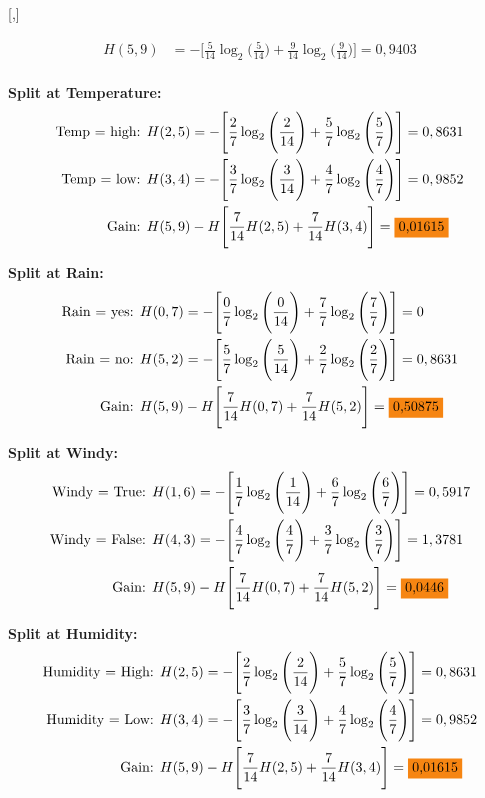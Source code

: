 \documentclass{article}
\begin{document}
[,]

\begin{align*}
    H(5,9) &= -\Bigg[\frac{5}{14} \log_2\Bigg(\frac{5}{14}\Bigg) + \frac{9}{14} \log_2\Bigg(\frac{9}{14}\Bigg)\Bigg] = 0,9403\\
\end{align*}

\textbf{Split at Temperature:}
\begin{align*}
    \text{Temp = high: } &H(2,5) = -\Bigg[\frac{2}{7} \log_2\Bigg(\frac{2}{14}\Bigg) + \frac{5}{7} \log_2\Bigg(\frac{5}{7}\Bigg)\Bigg] = 0,8631\\
    \text{Temp = low: } &H(3,4) = -\Bigg[\frac{3}{7} \log_2\Bigg(\frac{3}{14}\Bigg) + \frac{4}{7} \log_2\Bigg(\frac{4}{7}\Bigg)\Bigg] = 0,9852\\
    \text{Gain: } &H(5,9) - H\Bigg[\frac{7}{14} H(2,5) + \frac{7}{14} H(3,4)\Bigg] = \text{\colorbox{BurntOrange}{0,01615}}
\end{align*}

\textbf{Split at Rain:}
\begin{align*}
    \text{Rain = yes: } &H(0,7) = -\Bigg[\frac{0}{7} \log_2\Bigg(\frac{0}{14}\Bigg) + \frac{7}{7} \log_2\Bigg(\frac{7}{7}\Bigg)\Bigg] = 0\\
    \text{Rain = no: } &H(5,2) = -\Bigg[\frac{5}{7} \log_2\Bigg(\frac{5}{14}\Bigg) + \frac{2}{7} \log_2\Bigg(\frac{2}{7}\Bigg)\Bigg] = 0,8631\\
    \text{Gain: } &H(5,9) - H\Bigg[\frac{7}{14} H(0,7) + \frac{7}{14} H(5,2)\Bigg] = \text{\colorbox{BurntOrange}{0,50875}}
\end{align*}

\textbf{Split at Windy:}
\begin{align*}
    \text{Windy = True: } &H(1,6) = -\Bigg[\frac{1}{7} \log_2\Bigg(\frac{1}{14}\Bigg) + \frac{6}{7} \log_2\Bigg(\frac{6}{7}\Bigg)\Bigg] = 0,5917\\
    \text{Windy = False: } &H(4,3) = -\Bigg[\frac{4}{7} \log_2\Bigg(\frac{4}{7}\Bigg) + \frac{3}{7} \log_2\Bigg(\frac{3}{7}\Bigg)\Bigg] = 1,3781\\
    \text{Gain: } &H(5,9) - H\Bigg[\frac{7}{14} H(0,7) + \frac{7}{14} H(5,2)\Bigg] = \text{\colorbox{BurntOrange}{0,0446}}
\end{align*}

\textbf{Split at Humidity:}
\begin{align*}
    \text{Humidity = High: } &H(2,5) = -\Bigg[\frac{2}{7} \log_2\Bigg(\frac{2}{14}\Bigg) + \frac{5}{7} \log_2\Bigg(\frac{5}{7}\Bigg)\Bigg] = 0,8631\\
    \text{Humidity = Low: } &H(3,4) = -\Bigg[\frac{3}{7} \log_2\Bigg(\frac{3}{14}\Bigg) + \frac{4}{7} \log_2\Bigg(\frac{4}{7}\Bigg)\Bigg] = 0,9852\\
    \text{Gain: } &H(5,9) - H\Bigg[\frac{7}{14} H(2,5) + \frac{7}{14} H(3,4)\Bigg] = \text{\colorbox{BurntOrange}{0,01615}}
\end{align*}
\end{document}
